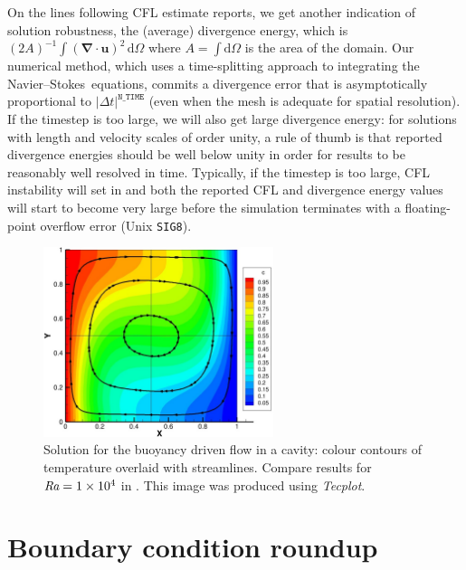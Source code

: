 \documentclass[11pt]{report}
\def\Ra{\mbox{\it Ra}}                              %
\newcommand{\Tecplot}{\emph{Tecplot}}
\newcommand\cd{\mathrm{d}} \newcommand\cD{\mathrm{D}}
\newcommand\NavSto{Navier--Stokes}
\begin{document}
On the lines following CFL estimate reports, we get another indication
of solution robustness, the (average) divergence energy, which is
$(2A)^{-1}\int (\bm{\nabla\cdot u})^2\, \cd \Omega$ where
$A=\int\cd\Omega$ is the area of the domain.  Our numerical method,
which uses a time-splitting approach to integrating the
\NavSto\ equations, commits a divergence error that is asymptotically
proportional to $|\Delta t|^\texttt{N\_TIME}$ (even when the mesh is
adequate for spatial resolution). If the timestep is too large, we
will also get large divergence energy: for solutions with length and
velocity scales of order unity, a rule of thumb is that reported
divergence energies should be well below unity in order for results to
be reasonably well resolved in time.  Typically, if the timestep is
too large, CFL instability will set in and both the reported CFL and
divergence energy values will start to become very large before the
simulation terminates with a floating-point overflow error (Unix
\verb|SIG8|).

\begin{figure}
\begin{center}
\includegraphics[width=0.6\textwidth]{tdrivcav}
\end{center}
\caption{
\label{fig.tdrivcav}
Solution for the buoyancy driven flow in a cavity: colour contours of
temperature overlaid with streamlines. Compare results for
$\Ra=1\times10^4$ in \citet{dvd83}. This image was produced using
\Tecplot.}
\end{figure}

\section{Boundary condition roundup}
\label{sec.bcs}
\end{document}
